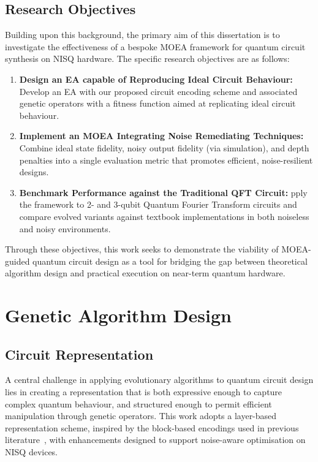 \documentclass[11pt,a4paper]{article}
\begin{document}
\subsection{Research Objectives}\label{sec:objectives}
Building upon this background, the primary aim of this dissertation is to investigate the effectiveness of a bespoke MOEA framework for quantum circuit synthesis on NISQ hardware. The specific research objectives are as follows:

\begin{enumerate}
    \item \textbf{Design an EA capable of Reproducing Ideal Circuit Behaviour:} Develop an EA with our proposed circuit encoding scheme and associated genetic operators with a fitness function aimed at replicating ideal circuit behaviour.
    
    \item \textbf{Implement an MOEA Integrating Noise Remediating Techniques:} Combine ideal state fidelity, noisy output fidelity (via simulation), and depth penalties into a single evaluation metric that promotes efficient, noise-resilient designs.
    
    \item \textbf{Benchmark Performance against the Traditional QFT Circuit:} pply the framework to 2- and 3-qubit Quantum Fourier Transform circuits and compare evolved variants against textbook implementations in both noiseless and noisy environments.
\end{enumerate}

Through these objectives, this work seeks to demonstrate the viability of MOEA-guided quantum circuit design as a tool for bridging the gap between theoretical algorithm design and practical execution on near-term quantum hardware.

%
%
\section{Genetic Algorithm Design}\label{sec:design}
\subsection{Circuit Representation}
A central challenge in applying evolutionary algorithms to quantum circuit design lies in creating a representation that is both expressive enough to capture complex quantum behaviour, and structured enough to permit efficient manipulation through genetic operators. This work adopts a layer-based representation scheme, inspired by the block-based encodings used in previous literature~\cite{Lukac2002EvolvingQC}, with enhancements designed to support noise-aware optimisation on NISQ devices.\newline
\end{document}
